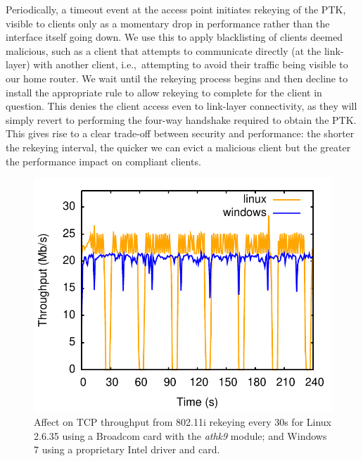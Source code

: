 Periodically, a timeout event at the access point initiates rekeying of the PTK,
visible to clients only as a momentary drop in performance rather than the
interface itself going down.  We use this to apply blacklisting of clients
deemed malicious, such as a client that attempts to communicate directly (at the
link-layer) with another client, i.e.,~attempting to avoid their traffic being visible
to our home router.  We wait until the rekeying process begins and then decline
to install the appropriate rule to allow rekeying to complete for the client in
question.  This denies the client access even to link-layer connectivity, as
they will simply revert to performing the four-way handshake required to obtain
the PTK\@.  This gives rise to a clear trade-off between security and performance:
the shorter the rekeying interval, the quicker we can evict a malicious client
but the greater the performance impact on compliant clients.  

\begin{figure} 
  \centering 
  \includegraphics[width=0.5\columnwidth]{Chapter2/Chapter2Figs/rekeying}
  \caption[Affect on TCP throughput from 802.11i rekeying]
  {\label{f:rekeying}Affect on TCP throughput from 802.11i rekeying every 30s
      for Linux 2.6.35 using a Broadcom card with the \emph{athk9} module; and
      Windows 7 using a proprietary Intel driver and card.} 
\end{figure}

